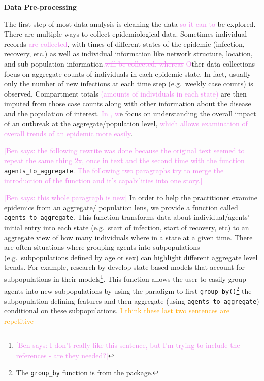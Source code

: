\documentclass[
  shortnames]{jss}
\begin{document}
\textbf{Data Pre-processing}

The first step of most data analysis is cleaning the data
\textcolor{violet}{so it can \sout{to}} be explored. There are multiple
ways to collect epidemiological data. Sometimes individual records
\textcolor{violet}{are collected}, with times of different states of the
epidemic (infection, recovery, etc.) as well as individual information
like network structure, location, and sub-population
information\textcolor{violet}{.\sout{will be collected, whereas}}
\textcolor{violet}{O}ther data collections focus on aggregate counts of
individuals in each epidemic state. In fact, usually only the number of
new infections at each time step (e.g.~weekly case counts) is observed.
Compartment totals
\textcolor{violet}{(amounts of individuals in each state)} are then
imputed from those case counts along with other information about the
disease and the population of interest.
\textcolor{violet}{In , w}e focus on understanding the
overall impact of an outbreak at the aggregate/population level,
\textcolor{violet}{which allows examination of overall trends of an epidemic more easily}.

\textcolor{violet}{[Ben says: the following rewrite was done because the original text seemed to repeat the same thing 2x, once in text and the second time with the function }\texttt{agents\_to\_aggregate}\textcolor{violet}{. The following two paragraphs try to merge the introduction of the function and it's capabilities into one story.]}

\textcolor{violet}{[Ben says: this whole paragraph is new]} In order to
help the practitioner examine epidemics from an aggregate/ population
lens, we provide a function called \texttt{agents\_to\_aggregate}. This
function transforms data about individual/agents' initial entry into
each state (e.g.~start of infection, start of recovery, etc) to an
aggregate view of how many individuals where in a state at a given time.
There are often situations where grouping agents into subpopulations
(e.g.~subpopulations defined by age or sex) can highlight different
aggregate level trends. For example, research by
\citet{rvachev1985,anderson1992,worby2015} develop state-based models
that account for subpopulations in their
models\footnote{\textcolor{violet}{[Ben says: I don't really like this sentence, but I'm trying to include the references - are they needed?]}}.
This function allows the user to easily group agents into new
subpopulations by using the  paradigm to first
\texttt{group\_by()}\footnote{The \texttt{group\_by} function is from
  the  package.} the subpopulation defining features and then
aggregate (using \texttt{agents\_to\_aggregate}) conditional on these
subpopulations.
\textcolor{orange}{I think these last two sentences are repetitive}
\end{document}
